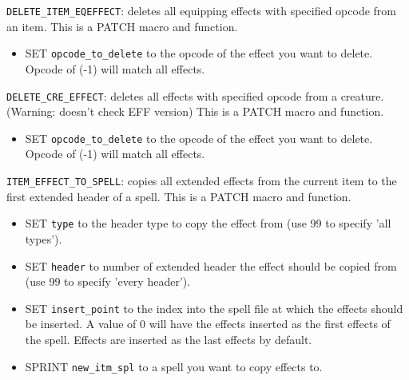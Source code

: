 \documentclass{article}
\begin{document}
\verb+DELETE_ITEM_EQEFFECT+: deletes all equipping effects with specified opcode from an item.
This is a PATCH macro and function.
\begin{itemize}
\item SET \verb+opcode_to_delete+ to the opcode of the effect you want to delete. Opcode of (-1) will match all effects.
\end{itemize}

\verb+DELETE_CRE_EFFECT+: deletes all effects with specified opcode from a creature. (Warning: doesn't check EFF version)
This is a PATCH macro and function.
\begin{itemize}
\item SET \verb+opcode_to_delete+ to the opcode of the effect you want to delete. Opcode of (-1) will match all effects.
\end{itemize}

\verb+ITEM_EFFECT_TO_SPELL+: copies all extended effects from the current item to the first extended header of a spell.
This is a PATCH macro and function.
\begin{itemize}
\item SET \verb+type+ to the header type to copy the effect from (use 99 to specify 'all types').
\item SET \verb+header+ to number of extended header the effect should be copied from (use 99 to specify 'every header').
\item SET \verb+insert_point+ to the index into the spell file at which the effects should be inserted. A value of 0 will have the effects inserted as the first effects of the spell. Effects are inserted as the last effects by default.
\item SPRINT \verb+new_itm_spl+ to a spell you want to copy effects to.
\end{itemize}
\end{document}
